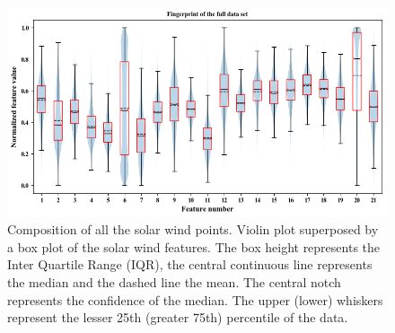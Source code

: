 \documentclass[utf8]{frontiersSCNS} %
\begin{document}
\begin{figure}[h!]
	\begin{center}
		\includegraphics[width=14cm]{Amaya/datarange}%
	\end{center}
	\caption{Composition of all the solar wind points. Violin plot superposed by a box plot of the solar wind features. The box height represents the Inter Quartile Range (IQR), the central continuous line represents the median and the dashed line the mean. The central notch represents the confidence of the median. The upper (lower) whiskers represent the lesser 25th (greater 75th) percentile of the data. }\label{fig:datarange}
\end{figure}
\end{document}

